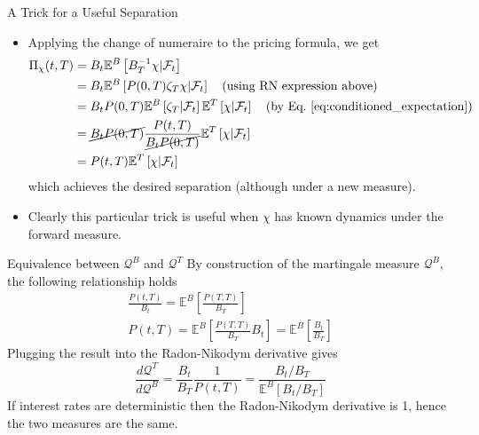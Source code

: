 \documentclass{beamer}
\begin{document}
\begin{frame}{A Trick for a Useful Separation}
	\begin{itemize}
		\item Applying the change of numeraire to the pricing formula, we get
		\begin{equation*}
			\begin{aligned}
			\Pi_\chi(t,T) & = B_t\mathbb{E}^B\left[B^{-1}_T\chi|\mathcal{F}_t\right] \\
			& = B_t\mathbb{E}^B\left[P(0,T)\zeta_T\chi|\mathcal{F}_t\right]\quad\text{(using RN expression above)}\\
			& = B_tP(0,T)\mathbb{E}^B\left[\zeta_T|\mathcal{F}_t\right]\mathbb{E}^T\left[\chi|\mathcal{F}_t\right]\quad\text{(by Eq.~\ref{eq:conditioned_expectation})}\\
			& = \cancel{B_tP(0,T)}\frac{P(t,T)}{\cancel{B_tP(0,T)}}\mathbb{E}^T\left[\chi|\mathcal{F}_t\right] \\
			& = P(t,T)\mathbb{E}^T\left[\chi|\mathcal{F}_t\right] \\
			\end{aligned}
		\end{equation*}
		which achieves the desired separation (although under a new measure).
		\item Clearly this particular trick is useful when $\chi$ has known dynamics under the forward measure.
	\end{itemize}
\end{frame}

\begin{frame}{Equivalence between $\mathcal{Q}^B$ and $\mathcal{Q}^T$}
By construction of the martingale measure $\mathcal{Q}^B$, the following relationship holds
\begin{equation*}
\begin{gathered}
\frac{P(t,T)}{B_t}=\mathbb{E}^B\left[\frac{P(T,T)}{B_T}\right]\\[0.3cm]
P(t,T)=\mathbb{E}^B\left[\frac{P(T,T)}{B_T}B_t\right] = \mathbb{E}^B\left[\frac{B_t}{B_T}\right]
\end{gathered}
\end{equation*}
Plugging the result into the Radon-Nikodym derivative gives
\begin{equation*}
	\frac{d\mathcal{Q}^T}{d\mathcal{Q}^B} = \frac{B_t}{B_T}\frac{1}{P(t,T)} =\frac{B_t/B_T}{\mathbb{E}^B[B_t/B_T]}
\end{equation*}	
If interest rates are deterministic then the Radon-Nikodym derivative is 1, hence the two measures are the same.
\end{frame}
\end{document}

